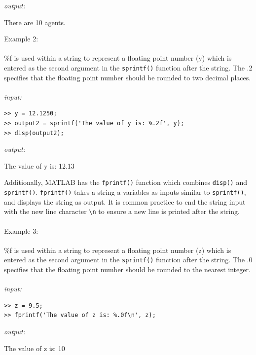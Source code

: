 \documentclass[../MATLAB_Primer.tex]{subfiles}
\begin{document}
\textit{output:}

\begin{center}
    There are 10 agents.
\end{center}

Example 2:
\\ \\
\%f is used within a string to represent a floating point number (y) which is entered as the second argument in the \texttt{sprintf()} function after the string. The .2 specifies that the floating point number should be rounded to two decimal places.
\\ \\
\textit{input:}
\begin{lstlisting}[frame=single]
>> y = 12.1250;
>> output2 = sprintf('The value of y is: %.2f', y); 
>> disp(output2);
\end{lstlisting}

\textit{output:}

\begin{center}
    The value of y is: 12.13
\end{center}

Additionally, MATLAB has the \texttt{fprintf()} function which combines \texttt{disp()} and \texttt{sprintf()}. \texttt{fprintf()} takes a string a variables as inputs similar to \texttt{sprintf()}, and displays the string as output. It is common practice to end the string input with the new line character \texttt{\textbackslash n} to ensure a new line is printed after the string. \\ \\
Example 3:
\\ \\
\%f is used within a string to represent a floating point number (z) which is entered as the second argument in the \texttt{sprintf()} function after the string. The .0 specifies that the floating point number should be rounded to the nearest integer.
\\ \\
\textit{input:}
\begin{lstlisting}[frame=single]
>> z = 9.5;
>> fprintf('The value of z is: %.0f\n', z); 
\end{lstlisting}

\textit{output:}

\begin{center}
    The value of z is: 10
\end{center}
\end{document}
